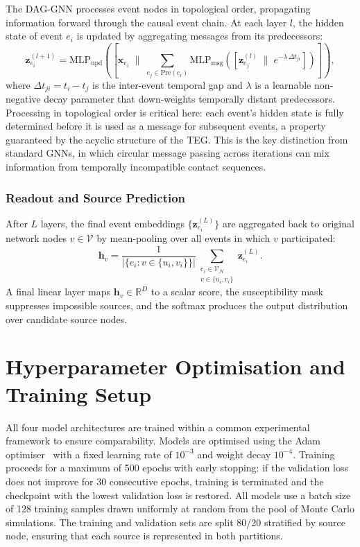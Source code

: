 The DAG-GNN processes event nodes in topological order, propagating information forward through the causal event chain. At each layer $l$, the hidden state of event $e_i$ is updated by aggregating messages from its predecessors:
\[
    \mathbf{z}_{e_i}^{(l+1)} = \mathrm{MLP}_{\mathrm{upd}}\!\left(\left[\mathbf{x}_{e_i} \;\Big\|\; \sum_{e_j \in \mathrm{Pre}(e_i)} \mathrm{MLP}_{\mathrm{msg}}\!\left(\left[\mathbf{z}_{e_j}^{(l)} \;\big\|\; e^{-\lambda\, \Delta t_{ji}}\right]\right)\right]\right),
\]
where $\Delta t_{ji} = t_i - t_j$ is the inter-event temporal gap and $\lambda$ is a learnable non-negative decay parameter that down-weights temporally distant predecessors. Processing in topological order is critical here: each event's hidden state is fully determined before it is used as a message for subsequent events, a property guaranteed by the acyclic structure of the TEG. This is the key distinction from standard GNNs, in which circular message passing across iterations can mix information from temporally incompatible contact sequences.

\subsubsection{Readout and Source Prediction}
\label{sssec:dag-readout}

After $L$ layers, the final event embeddings $\{\mathbf{z}_{e_i}^{(L)}\}$ are aggregated back to original network nodes $v \in \mathcal{V}$ by mean-pooling over all events in which $v$ participated:
\[
    \mathbf{h}_v = \frac{1}{|\{e_i : v \in \{u_i, v_i\}\}|} \sum_{\substack{e_i \in \mathcal{V}_{\mathcal{H}} \\ v \in \{u_i, v_i\}}} \mathbf{z}_{e_i}^{(L)}.
\]
A final linear layer maps $\mathbf{h}_v \in \mathbb{R}^D$ to a scalar score, the susceptibility mask suppresses impossible sources, and the softmax produces the output distribution over candidate source nodes.

\section{Hyperparameter Optimisation and Training Setup}
\label{st:hyperparameter}

All four model architectures are trained within a common experimental framework to ensure comparability. Models are optimised using the Adam optimiser~\cite{Kingma2015} with a fixed learning rate of $10^{-3}$ and weight decay $10^{-4}$. Training proceeds for a maximum of 500 epochs with early stopping: if the validation loss does not improve for 30 consecutive epochs, training is terminated and the checkpoint with the lowest validation loss is restored. All models use a batch size of 128 training samples drawn uniformly at random from the pool of Monte Carlo simulations. The training and validation sets are split 80/20 stratified by source node, ensuring that each source is represented in both partitions.

